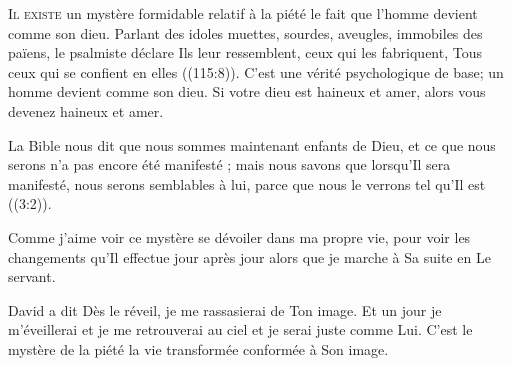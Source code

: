 


\lettrine{I}{l existe} un mystère formidable relatif à la piété
 \ocadr le fait que l'homme devient comme son dieu.
 Parlant des idoles muettes, sourdes, aveugles, immobiles des païens,
 le psalmiste déclare\frcolon {}
 \Og Ils leur ressemblent, ceux qui les fabriquent,
 Tous ceux qui se confient en elles \Fg{} ((115:8)).
 C'est une vérité psychologique de base;
 un homme devient comme son dieu.
 Si votre dieu est haineux et amer, alors vous devenez haineux et amer.


La Bible nous dit que \Og nous 
 sommes maintenant enfants de Dieu, et ce que nous serons n'a pas encore
 été manifesté ; mais nous savons que lorsqu'Il sera manifesté,
 nous serons semblables à lui, parce que nous le verrons
 tel qu'Il est \Fg{} ((3:2)).

Comme j'aime voir ce mystère se dévoiler dans ma propre vie,
 pour voir les changements qu'Il effectue jour après jour
 alors que je marche à Sa suite en Le servant.

David a dit\frcolon {}
 \Og Dès le réveil, je me rassasierai de Ton image. \Fg{}
 Et un jour je m'éveillerai et je me retrouverai au ciel
 et je serai juste comme Lui. C'est le mystère de la piété\frcolon
 la vie transformée conformée à Son image.

\dvrule






